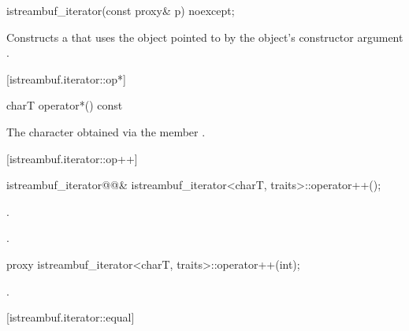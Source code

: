 %
\begin{itemdecl}
istreambuf_iterator(const proxy& p) noexcept;
\end{itemdecl}

\begin{itemdescr}
\pnum
\effects
Constructs a
that uses the
object pointed to by the
object's constructor argument .
\end{itemdescr}

[istreambuf.iterator::op*]{}

%
\begin{itemdecl}
charT operator*() const
\end{itemdecl}

\begin{itemdescr}
\pnum
\returns
The character obtained via the
member
.
\end{itemdescr}

[istreambuf.iterator::op++]{}

%
\begin{itemdecl}
istreambuf_iterator@@&
    istreambuf_iterator<charT, traits>::operator++();
\end{itemdecl}

\begin{itemdescr}
\pnum
\effects {}
.

\pnum
\returns
{}.
\end{itemdescr}

%
%
\begin{itemdecl}
proxy istreambuf_iterator<charT, traits>::operator++(int);
\end{itemdecl}

\begin{itemdescr}
\pnum
{}
.
\end{itemdescr}

[istreambuf.iterator::equal]{}

